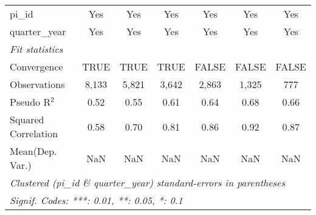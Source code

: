 \begin{tabular}{lcccccc}
   pi\_id                                                     & Yes           & Yes           & Yes           & Yes           & Yes           & Yes\\  
   quarter\_year                                              & Yes           & Yes           & Yes           & Yes           & Yes           & Yes\\  
   \midrule
   \emph{Fit statistics}\\
   Convergence                                                &TRUE           & TRUE          & TRUE          & FALSE         & FALSE         & FALSE\\  
   Observations                                               & 8,133         & 5,821         & 3,642         & 2,863         & 1,325         & 777\\  
   Pseudo R$^2$                                               & 0.52          & 0.55          & 0.61          & 0.64          & 0.68          & 0.66\\  
   Squared Correlation                                        & 0.58          & 0.70          & 0.81          & 0.86          & 0.92          & 0.87\\  
Mean(Dep. Var.) & NaN & NaN & NaN & NaN & NaN & NaN \\
   \midrule \midrule
   \multicolumn{7}{l}{\emph{Clustered (pi\_id \& quarter\_year) standard-errors in parentheses}}\\
   \multicolumn{7}{l}{\emph{Signif. Codes: ***: 0.01, **: 0.05, *: 0.1}}\\
\end{tabular}
\par\endgroup
